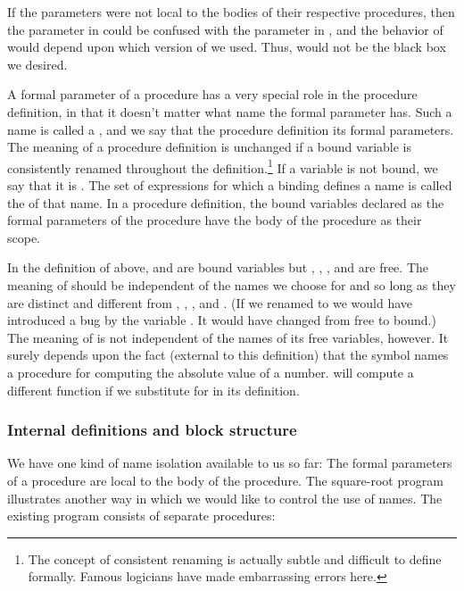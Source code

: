 If the parameters were not local to the bodies of their respective procedures,
then the parameter  in  could be confused with the
parameter  in , and the behavior of
 would depend upon which version of  we used.
Thus,  would not be the black box we desired.

A formal parameter of a procedure has a very special role in the procedure
definition, in that it doesn't matter what name the formal parameter has.  Such
a name is called a , and we say that the procedure
definition  its formal parameters.  The meaning of a procedure
definition is unchanged if a bound variable is consistently renamed throughout
the definition.\footnote{The concept of consistent renaming is actually subtle
and difficult to define formally.  Famous logicians have made embarrassing
errors here.}  If a variable is not bound, we say that it is .
The set of expressions for which a binding defines a name is called the
 of that name.  In a procedure definition, the bound variables
declared as the formal parameters of the procedure have the body of the
procedure as their scope.

In the definition of  above,  and  are
bound variables but \code{<}, \code{-}, , and  are free.
The meaning of  should be independent of the names we choose
for  and  so long as they are distinct and different from
\code{<}, \code{-}, , and .  (If we renamed 
to  we would have introduced a bug by  the
variable .  It would have changed from free to bound.)  The meaning
of  is not independent of the names of its free variables,
however.  It surely depends upon the fact (external to this definition) that
the symbol  names a procedure for computing the absolute value of a
number.   will compute a different function if we substitute
 for  in its definition.

\subsubsection*{Internal definitions and block structure}

We have one kind of name isolation available to us so far: The formal
parameters of a procedure are local to the body of the procedure.  The
square-root program illustrates another way in which we would like to control
the use of names.  The existing program consists of separate procedures:

